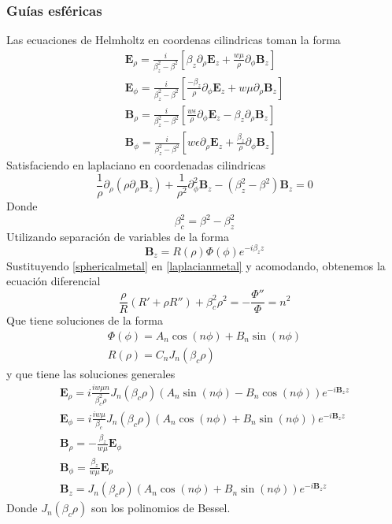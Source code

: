 \subsubsection{Guías esféricas}
Las ecuaciones de Helmholtz en coordenas cilindricas toman la forma
\begin{eqnarray}
	\textbf{E}_{\rho}=\frac{i}{\beta^2_{z}-\beta^2} \left[ \beta_{z} \partial_{\rho} \textbf{E}_{z}+ \frac{w \mu}{\rho}\partial_{\phi}\textbf{B}_{z} \right] \\
		\textbf{E}_{\phi}=\frac{i}{\beta^2_{z}-\beta^2} \left[ \frac{-\beta_{z}}{\rho} \partial_{\phi} \textbf{E}_{z}+ w \mu\partial_{\rho}\textbf{B}_{z} \right] \\
\textbf{B}_{\rho}=\frac{i}{\beta^2_{z}-\beta^2} \left[ \frac{w \epsilon}{\rho} \partial_{\phi} \textbf{E}_{z}- \beta_{z} \partial_{\rho}\textbf{B}_{z} \right] \\
\textbf{B}_{\phi}=\frac{i}{\beta^2_{z}-\beta^2} \left[ w \epsilon \partial_{\rho} \textbf{E}_{z}+ \frac{\beta_{z}}{\rho} \partial_{\phi}\textbf{B}_{z} \right] 	
\end{eqnarray}
Satisfaciendo en laplaciano en coordenadas cilindricas
\begin{equation}\label{laplacianmetal}
\frac{1}{\rho}\partial_{\rho}(\rho \partial_{\rho} \textbf{B}_{z}) + \frac{1}{\rho^2} \partial_{\phi}^2 \textbf{B}_{z}-(\beta_{z}^2-\beta^2)\textbf{B}_{z}=0
\end{equation}
Donde
\begin{equation}
	\beta_{c}^2=\beta^2-\beta_{z}^2
\end{equation}
Utilizando separación de variables de la forma
\begin{equation}\label{sphericalmetal}
\textbf{B}_{z}=R(\rho)\Phi(\phi)e^{-i\beta_{z}z}
\end{equation}
Sustituyendo \ref{sphericalmetal} en \ref{laplacianmetal} y acomodando, obtenemos la ecuación diferencial
\begin{equation}
\frac{\rho}{R}(R'+\rho R'')+\beta_{c}^2\rho^2=-\frac{\Phi''}{\Phi}=n^2
\end{equation} 
Que tiene soluciones de la forma
\begin{eqnarray}
\Phi(\phi)=A_{n}\cos(n\phi)+B_{n}\sin(n\phi) \\
R(\rho)=C_{n}J_{n}(\beta_{c}\rho)
\end{eqnarray}
y que tiene las soluciones generales
\begin{eqnarray}
	\textbf{E}_{\rho}=i\frac{i w \mu n}{\beta_{c}^2\rho}J_{n}(\beta_{c}\rho)(A_{n}\sin(n\phi)-B_{n}\cos(n \phi))e^{-i\textbf{B}_{z}z} \\
	\textbf{E}_{\phi}=i\frac{i w \mu }{\beta_{c}}J_{n}(\beta_{c}\rho)(A_{n}\cos(n\phi)+B_{n}\sin(n \phi))e^{-i\textbf{B}_{z}z}\\
	\textbf{B}_{\rho}=-\frac{\beta_{z}}{w\mu}\textbf{E}_{\phi}\\
	\textbf{B}_{\phi}=\frac{\beta_{z}}{w\mu}\textbf{E}_{\rho}\\
	\textbf{B}_{z}=J_{n}(\beta_{c}\rho)(A_{n}\cos(n\phi)+B_{n}\sin(n \phi))e^{-i\textbf{B}_{z}z}
\end{eqnarray}
Donde $J_{n}(\beta_{c}\rho)$ son los polinomios de Bessel.
